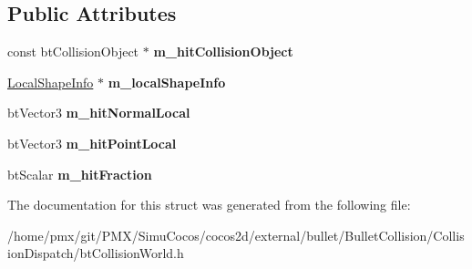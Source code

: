 \subsection*{Public Attributes}
\begin{DoxyCompactItemize}
\item 
\mbox{\label{structbtCollisionWorld_1_1LocalConvexResult_a05216b0cfed420a7c31d517ab3a114f0}} 
const bt\+Collision\+Object $\ast$ {\bfseries m\+\_\+hit\+Collision\+Object}
\item 
\mbox{\label{structbtCollisionWorld_1_1LocalConvexResult_a126cfbc28a399e4badff39edf2142fe6}} 
\hyperlink{structbtCollisionWorld_1_1LocalShapeInfo}{Local\+Shape\+Info} $\ast$ {\bfseries m\+\_\+local\+Shape\+Info}
\item 
\mbox{\label{structbtCollisionWorld_1_1LocalConvexResult_a7f5d5d5c89c8399eac913f94c6ee99ca}} 
bt\+Vector3 {\bfseries m\+\_\+hit\+Normal\+Local}
\item 
\mbox{\label{structbtCollisionWorld_1_1LocalConvexResult_a1b1d40bf67c8906599a8e99ed2b7b89f}} 
bt\+Vector3 {\bfseries m\+\_\+hit\+Point\+Local}
\item 
\mbox{\label{structbtCollisionWorld_1_1LocalConvexResult_aa7a616613c1260e3e51c0482da3015e6}} 
bt\+Scalar {\bfseries m\+\_\+hit\+Fraction}
\end{DoxyCompactItemize}


The documentation for this struct was generated from the following file\+:\begin{DoxyCompactItemize}
\item 
/home/pmx/git/\+P\+M\+X/\+Simu\+Cocos/cocos2d/external/bullet/\+Bullet\+Collision/\+Collision\+Dispatch/bt\+Collision\+World.\+h\end{DoxyCompactItemize}
